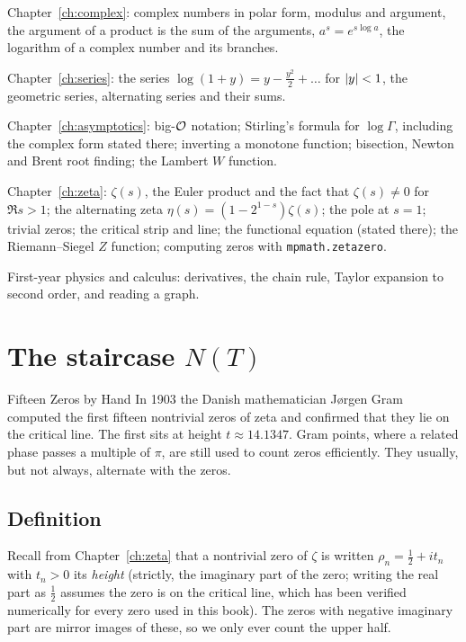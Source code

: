 \begin{prerequisites}
\item Chapter~\ref{ch:complex}: complex numbers in polar form, modulus and argument, the argument of a product is the sum of the arguments, $a^s=e^{s\log a}$, the logarithm of a complex number and its branches.
\item Chapter~\ref{ch:series}: the series $\log(1+y)=y-\tfrac{y^2}{2}+\dots$ for $\left\lvert y\right\rvert<1$, the geometric series, alternating series and their sums.
\item Chapter~\ref{ch:asymptotics}: big-$\mathcal{O}$ notation; Stirling's formula for $\log\Gamma$, including the complex form stated there; inverting a monotone function; bisection, Newton and Brent root finding; the Lambert $W$ function.
\item Chapter~\ref{ch:zeta}: $\zeta(s)$, the Euler product and the fact that $\zeta(s)\neq0$ for $\Re s>1$; the alternating zeta $\eta(s)=(1-2^{1-s})\zeta(s)$; the pole at $s=1$; trivial zeros; the critical strip and line; the functional equation (stated there); the Riemann--Siegel $Z$ function; computing zeros with \texttt{mpmath.zetazero}.
\item First-year physics and calculus: derivatives, the chain rule, Taylor expansion to second order, and reading a graph.
\end{prerequisites}

\section{The staircase $N(T)$}\label{sec:counting-zeros-staircase}
\begin{didyouknow}{Fifteen Zeros by Hand}
In 1903 the Danish mathematician J{\o}rgen Gram computed the first fifteen nontrivial zeros of zeta and confirmed that they lie on the critical line. The first sits at height $t\approx14.1347$. Gram points, where a related phase passes a multiple of $\pi$, are still used to count zeros efficiently. They usually, but not always, alternate with the zeros.
\end{didyouknow}

\subsection{Definition}

Recall from Chapter~\ref{ch:zeta} that a nontrivial zero of $\zeta$ is written $\rho_n=\tfrac12+it_n$ with $t_n>0$ its \emph{height} (strictly, the imaginary part of the zero; writing the real part as $\tfrac12$ assumes the zero is on the critical line, which has been verified numerically for every zero used in this book). The zeros with negative imaginary part are mirror images of these, so we only ever count the upper half.

